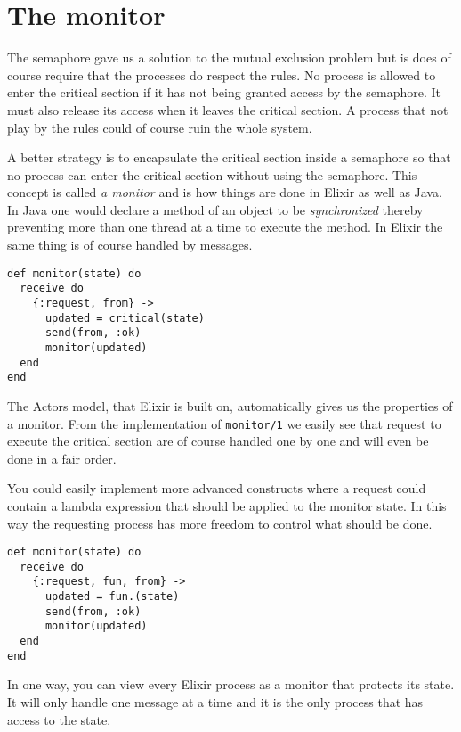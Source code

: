 \documentclass[a4paper,11pt]{article}
\begin{document}

\section{The monitor}

The semaphore gave us a solution to the mutual exclusion problem but
is does of course require that the processes do respect the rules. No
process is allowed to enter the critical section if it has not being
granted access by the semaphore. It must also release its access when
it leaves the critical section. A process that not play by the rules
could of course ruin the whole system.

A better strategy is to encapsulate the critical section inside a
semaphore so that no process can enter the critical section without
using the semaphore. This concept is called {\em a monitor} and is how
things are done in Elixir as well as Java. In Java one would declare a
method of an object to be {\em synchronized} thereby preventing more
than one thread at a time to execute the method. In Elixir the same
thing is of course handled by messages.

\begin{verbatim}
def monitor(state) do
  receive do
    {:request, from} ->
      updated = critical(state)
      send(from, :ok)
      monitor(updated)
  end
end
\end{verbatim}

The Actors model, that Elixir is built on, automatically gives us the
properties of a monitor. From the implementation of {\tt monitor/1}
we easily see that request to execute the critical section are of
course handled one by one and will even be done in a fair order.

You could easily implement more advanced constructs where a request
could contain a lambda expression that should be applied to the
monitor state. In this way the requesting process has more freedom to
control what should be done.

\begin{verbatim}
def monitor(state) do
  receive do
    {:request, fun, from} ->
      updated = fun.(state)
      send(from, :ok)
      monitor(updated)
  end
end
\end{verbatim}

In one way, you can view every Elixir process as a monitor that
protects its state. It will only handle one message at a time and it
is the only process that has access to the state.
\end{document}
